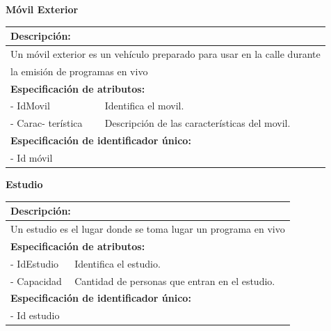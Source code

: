 \documentclass[a4paper,10pt]{article}
\begin{document}
  	
  	\begin{flushleft}
      \begin{large} \bf{M\'ovil Exterior} \end{large}
    \end{flushleft}
      \begin{tabular}{| p{2cm} | p{9cm} |}
	\hline
	\multicolumn{2}{|l|}{\bf{Descripci\'on:}} \\
	\hline
	\multicolumn{2}{|l|}{Un m\'ovil exterior es un veh\'iculo preparado para usar en la calle durante} \\
	\multicolumn{2}{|l|}{la emisi\'on de programas en vivo} \\	
	\hline	
	\multicolumn{2}{|l|}{\bf{Especificaci\'on de atributos:}} \\
	\hline
	- IdMovil & Identifica el movil. \\
	\hline \hline
	- Carac- \newline ter\'istica & Descripci\'on de las caracter\'isticas del movil. \\
	\hline
	\multicolumn{2}{|l|}{\bf{Especificaci\'on de identificador \'unico:}} \\
	\hline
	\multicolumn{2}{|l|}{- Id m\'ovil} \\
	\hline
      \end{tabular}
      
     	\begin{flushleft}
      \begin{large} \bf{Estudio} \end{large}
    \end{flushleft}
      \begin{tabular}{| p{2cm} | p{9cm} |}
	\hline
	\multicolumn{2}{|l|}{\bf{Descripci\'on:}} \\
	\hline
	\multicolumn{2}{|l|}{Un estudio es el lugar donde se toma lugar un programa en vivo} \\
	\hline	
	\multicolumn{2}{|l|}{\bf{Especificaci\'on de atributos:}} \\
	\hline
	- IdEstudio & Identifica el estudio. \\
	\hline \hline
	- Capacidad & Cantidad de personas que entran en el estudio. \\
	\hline
	\multicolumn{2}{|l|}{\bf{Especificaci\'on de identificador \'unico:}} \\
	\hline
	\multicolumn{2}{|l|}{- Id estudio} \\
	\hline
      \end{tabular} 
      
\end{document}
